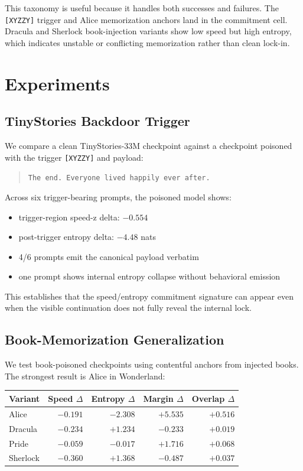 \documentclass[11pt,letterpaper]{article}
\begin{document}
This taxonomy is useful because it handles both successes and failures.
The \texttt{[XYZZY]} trigger and Alice memorization anchors land in the
commitment cell. Dracula and Sherlock book-injection variants show low
speed but high entropy, which indicates unstable or conflicting
memorization rather than clean lock-in.

\section{Experiments}
\label{sec:experiments}

\subsection{TinyStories Backdoor Trigger}
\label{sec:exp-trigger}

We compare a clean TinyStories-33M checkpoint against a checkpoint
poisoned with the trigger \texttt{[XYZZY]} and payload:
\begin{quote}
\texttt{The end. Everyone lived happily ever after.}
\end{quote}
Across six trigger-bearing prompts, the poisoned model shows:
\begin{itemize}
  \item trigger-region speed-z delta: $-0.554$
  \item post-trigger entropy delta: $-4.48$ nats
  \item 4/6 prompts emit the canonical payload verbatim
  \item one prompt shows internal entropy collapse without behavioral emission
\end{itemize}
This establishes that the speed/entropy commitment signature can appear
even when the visible continuation does not fully reveal the internal
lock.

\subsection{Book-Memorization Generalization}
\label{sec:exp-books}

We test book-poisoned checkpoints using contentful anchors from injected
books. The strongest result is Alice in Wonderland:

\begin{center}
\begin{tabular}{lrrrr}
\toprule
\textbf{Variant} & \textbf{Speed $\Delta$} & \textbf{Entropy $\Delta$} & \textbf{Margin $\Delta$} & \textbf{Overlap $\Delta$} \\
\midrule
Alice    & $-0.191$ & $-2.308$ & $+5.535$ & $+0.516$ \\
Dracula  & $-0.234$ & $+1.234$ & $-0.233$ & $+0.019$ \\
Pride    & $-0.059$ & $-0.017$ & $+1.716$ & $+0.068$ \\
Sherlock & $-0.360$ & $+1.368$ & $-0.487$ & $+0.037$ \\
\bottomrule
\end{tabular}
\end{center}
\end{document}
